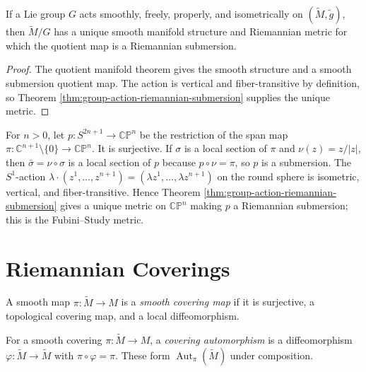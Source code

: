 \begin{corollary}
\label{cor:quotient-manifold-lie-group-riemannian-metric}
If a Lie group $G$ acts smoothly, freely, properly, and isometrically on $(\tilde M,\tilde g)$, then $\tilde M/G$ has a unique smooth manifold structure and Riemannian metric for which the quotient map is a Riemannian submersion.
\end{corollary}

\begin{proof}
\sketch The quotient manifold theorem gives the smooth structure and a smooth submersion quotient map. The action is vertical and fiber-transitive by definition, so Theorem \ref{thm:group-action-riemannian-submersion} supplies the unique metric.
\end{proof}

\begin{example}
\label{ex:fubini-study-metric}
For $n>0$, let $p:S^{2n+1}\to\mathbb{CP}^n$ be the restriction of the span map $\pi:\mathbb C^{n+1}\setminus\{0\}\to\mathbb{CP}^n$. It is surjective. If $\sigma$ is a local section of $\pi$ and $\nu(z)=z/|z|$, then $\bar\sigma=\nu\circ\sigma$ is a local section of $p$ because $p\circ\nu=\pi$, so $p$ is a submersion. The $S^1$-action $\lambda\cdot(z^1,\ldots,z^{n+1})=(\lambda z^1,\ldots,\lambda z^{n+1})$ on the round sphere is isometric, vertical, and fiber-transitive. Hence Theorem \ref{thm:group-action-riemannian-submersion} gives a unique metric on $\mathbb{CP}^n$ making $p$ a Riemannian submersion; this is the Fubini--Study metric.
\end{example}

\section{Riemannian Coverings}

\begin{definition}
\label{def:smooth-covering-map}
\leanok
{}
A smooth map $\pi:\tilde M\to M$ is a \emph{smooth covering map} if it is surjective, a topological covering map, and a local diffeomorphism.
\end{definition}

\begin{definition}
\label{def:covering-automorphism-group}
\leanok
{}
For a smooth covering $\pi:\tilde M\to M$, a \emph{covering automorphism} is a diffeomorphism $\varphi:\tilde M\to\tilde M$ with $\pi\circ\varphi=\pi$. These form $\operatorname{Aut}_\pi(\tilde M)$ under composition.
\end{definition}

